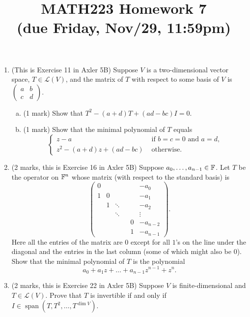 \documentclass[12pt]{article}
\begin{document}
\title{MATH223 Homework 7\\ (due Friday, Nov/29, 11:59pm)}
\author{}
\date{}
\maketitle
{}

\begin{enumerate}
\item (This is Exercise 11 in Axler 5B) Suppose $V$ is a two-dimensional vector space, $T\in \mathcal{L}(V)$, and the matrix of $T$ with respect to some basis of $V$ is $
  \begin{pmatrix}
    a & b \\
    c & d
  \end{pmatrix}$.
  \begin{enumerate}[(a)]    
  \item (1 mark) Show that $T^2-(a+d)T+(ad-bc)I=0$.
  \item (1 mark) Show that the minimal polynomial of $T$ equals
    \[
      \begin{cases}
        z-a &\text{ if }b=c=0\text{ and }a=d, \\
        z^2-(a+d)z+(ad-bc) &\text{ otherwise}.
      \end{cases}
    \]
  \end{enumerate}
\item (2 marks, this is Exercise 16 in Axler 5B) Suppose $a_0,\ldots ,a_{n-1}\in \mathbb{F}$. Let $T$ be the operator on $\mathbb{F}^n$ whose matrix (with respect to the standard basis) is
  \[
    \begin{pmatrix}
      0 & & & & & -a_0 \\
      1 & 0 & & & & -a_1 \\
        & 1 & \ddots & & & -a_2 \\
        & & \ddots & & & \vdots \\
        & & & & 0 & -a_{n-2} \\
        & & & & 1 & -a_{n-1}
    \end{pmatrix}.
  \]
  Here all the entries of the matrix are $0$ except for all $1$'s on the line under the diagonal and the entries in the last column (some of which might also be $0$). Show that the minimal polynomial of $T$ is the polynomial
  \[
    a_0+a_1z+\ldots +a_{n-1}z^{n-1}+z^n.
  \]
\item (2 marks, this is Exercise 22 in Axler 5B) Suppose $V$ is finite-dimensional and $T\in \mathcal{L}(V)$. Prove that $T$ is invertible if and only if $I\in\operatorname{span}(T,T^2,\ldots ,T^{\dim V})$.

\end{enumerate}
\end{document}
